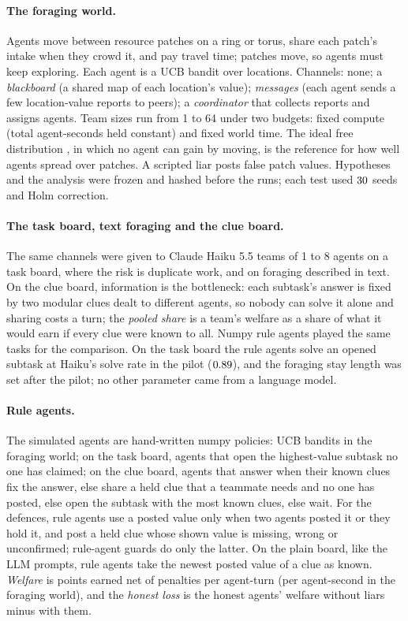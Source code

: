 \documentclass{article}
\begin{document}
\paragraph{The foraging world.} Agents move between resource patches on a ring or torus, share each patch's intake when they crowd it, and pay travel time; patches move, so agents must keep exploring. Each agent is a UCB bandit over locations. Channels: none; a \emph{blackboard} (a shared map of each location's value); \emph{messages} (each agent sends a few location-value reports to peers); a \emph{coordinator} that collects reports and assigns agents. Team sizes run from 1 to 64 under two budgets: fixed compute (total agent-seconds held constant) and fixed world time. The ideal free distribution \citep{fretwell1969ifd}, in which no agent can gain by moving, is the reference for how well agents spread over patches. A scripted liar posts false patch values. Hypotheses and the analysis were frozen and hashed before the runs; each test used $30$ seeds and Holm correction.

\paragraph{The task board, text foraging and the clue board.} The same channels were given to Claude Haiku 5.5 teams of 1 to 8 agents on a task board, where the risk is duplicate work, and on foraging described in text. On the clue board, information is the bottleneck: each subtask's answer is fixed by two modular clues dealt to different agents, so nobody can solve it alone and sharing costs a turn; the \emph{pooled share} is a team's welfare as a share of what it would earn if every clue were known to all. Numpy rule agents played the same tasks for the comparison. On the task board the rule agents solve an opened subtask at Haiku's solve rate in the pilot ($0.89$), and the foraging stay length was set after the pilot; no other parameter came from a language model.

\paragraph{Rule agents.} The simulated agents are hand-written numpy policies: UCB bandits in the foraging world; on the task board, agents that open the highest-value subtask no one has claimed; on the clue board, agents that answer when their known clues fix the answer, else share a held clue that a teammate needs and no one has posted, else open the subtask with the most known clues, else wait. For the defences, rule agents use a posted value only when two agents posted it or they hold it, and post a held clue whose shown value is missing, wrong or unconfirmed; rule-agent guards do only the latter. On the plain board, like the LLM prompts, rule agents take the newest posted value of a clue as known. \emph{Welfare} is points earned net of penalties per agent-turn (per agent-second in the foraging world), and the \emph{honest loss} is the honest agents' welfare without liars minus with them.
\end{document}
